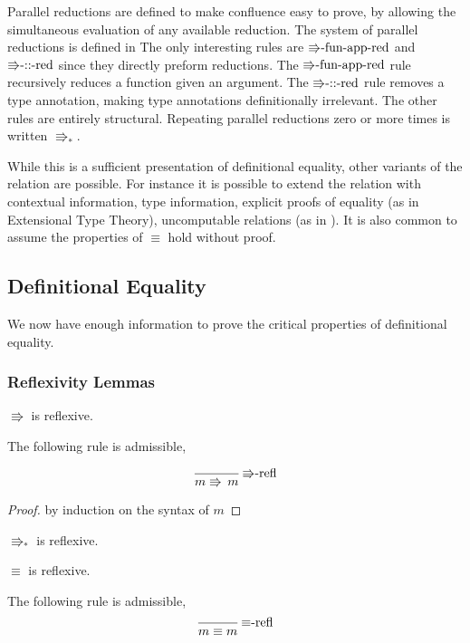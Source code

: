 Parallel reductions are defined to make confluence easy to prove, by allowing the simultaneous evaluation of any available reduction.
The system of parallel reductions is defined in  The only interesting rules are $\textrm{\ensuremath{\Rrightarrow}-fun-app-red}$ and $\textrm{\ensuremath{\Rrightarrow}-::-red}$ since they directly preform reductions.
The $\textrm{\ensuremath{\Rrightarrow}-fun-app-red}$ rule recursively reduces a function given an argument.
The $\textrm{\ensuremath{\Rrightarrow}-::-red}$ rule removes a type annotation, making type annotations definitionally irrelevant.
The other rules are entirely structural.
Repeating parallel reductions zero or more times is written $\Rrightarrow_{\ast}$.

While this is a sufficient presentation of definitional equality, other variants of the relation are possible.
For instance it is possible to extend the relation with contextual information, type information, explicit proofs of equality (as in Extensional Type Theory), uncomputable relations (as in \cite{jia2010dependent}).
It is also common to assume the properties of $\equiv$ hold without proof.

\subsection{Definitional Equality}

We now have enough information to prove the critical properties of definitional equality.

\subsubsection{Reflexivity Lemmas}
\begin{lem}
$\Rrightarrow$ is reflexive.

The following rule is admissible,

\[
\frac{\,}{m\Rrightarrow\,m}\,\textrm{\ensuremath{\Rrightarrow}-refl}
\]
\end{lem}

\begin{proof}
by induction on the syntax of $m$
\end{proof}
\begin{fact}
$\Rrightarrow_{\ast}$ is reflexive.
\end{fact}

\begin{lem}
$\equiv$ is reflexive.

The following rule is admissible,
\[
\frac{\,}{m\equiv m}\,\textrm{\ensuremath{\equiv}-refl}
\]
\end{lem}

